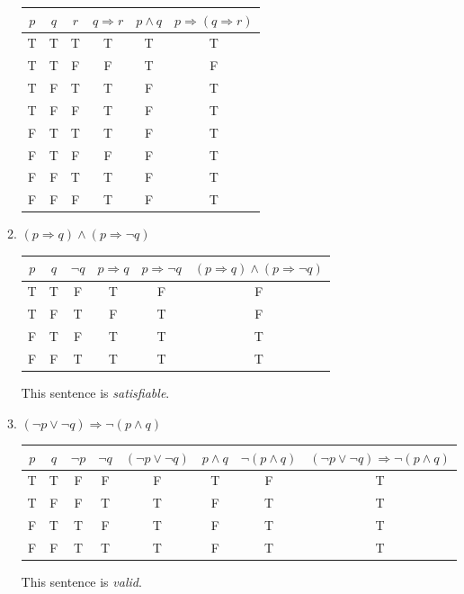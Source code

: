 \documentclass{article}
\begin{document}
\begin{enumerate}
\begin{enumerate}
					\begin{tabular}{|c|c|c|c|c|c|}
						\hline
						$p$ & $q$ & $r$ & $q \Rightarrow r$ & $p \wedge q$ & $p \Rightarrow (q \Rightarrow r)$\\
						\hline
						T & T & T & T & T & T\\
						\hline 
						T & T & F & F & T & F\\
						\hline
						T & F & T & T & F & T\\
						\hline
						T & F & F & T & F & T\\
						\hline
						F & T & T & T & F & T\\
						\hline
						F & T & F & F & F & T\\
						\hline
						F & F & T & T & F & T\\
						\hline
						F & F & F & T & F & T\\
						\hline
					\end{tabular}

				\item $(p \Rightarrow q) \wedge ( p \Rightarrow \neg q)$

					\begin{tabular}{|c|c|c|c|c|c|}
						\hline
						$p$ & $q$ & $\neg q$ & $p \Rightarrow q$ & $p \Rightarrow \neg q$ 
						& $(p \Rightarrow q) \wedge ( p \Rightarrow \neg q)$ \\
						\hline
						T & T & F & T & F & F\\
						\hline
						T & F & T & F & T & F\\
						\hline
						F & T & F & T & T & T\\
						\hline
						F & F & T & T & T & T\\
						\hline
					\end{tabular}

					This sentence is \emph{satisfiable}.

				\item $(\neg p \vee \neg q) \Rightarrow \neg (p \wedge q)$

					\begin{tabular}{|c|c|c|c|c|c|c|c|}
						\hline
						$p$ & $q$ & $\neg p$ & $\neg q$ & $(\neg p \vee \neg q)$ & $p \wedge q$ & $\neg(p \wedge q)$ &
						$(\neg p \vee \neg q) \Rightarrow \neg (p \wedge q)$\\
						\hline
						T & T & F & F & F & T & F & T\\
						\hline
						T & F & F & T & T & F & T & T\\
						\hline
						F & T & T & F & T & F & T & T\\
						\hline
						F & F & T & T & T & F & T & T\\
						\hline

					\end{tabular}

					This sentence is \emph{valid}.
		\end{enumerate}
\end{enumerate}
\end{document}
